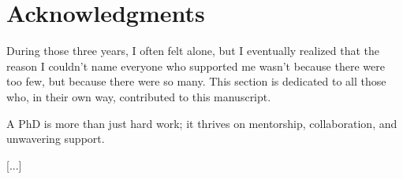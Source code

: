 \chapter*{Acknowledgments}
%



During those three years, I often felt alone, but I eventually realized that the reason I couldn't name everyone who supported me wasn't because there were too few, but because there were so many.
This section is dedicated to all those who, in their own way, contributed to this manuscript.

A PhD is more than just hard work; it thrives on mentorship, collaboration, and unwavering support.

[...]